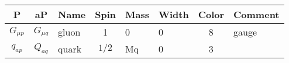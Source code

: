\begin{tabular}{|cc|l|c|l|l|c|l|} \hline
P & aP & Name & Spin & Mass & Width & Color &  Comment \\ \hline
$G_{\mu p}$&$G_{\mu q}$&gluon         &1           &0     &0     &8    &gauge\\
$q_{ap}$  &$Q_{aq}$  &quark         &$1/2$       &Mq    &0     &3    &   \\ \hline
\end{tabular}
